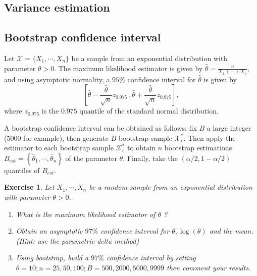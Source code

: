 \documentclass{article}\usepackage[]{graphicx}\usepackage[]{xcolor}
\newtheorem{exercise}{Exercise}
\begin{document}
\subsection{Variance estimation}

\subsection{Bootstrap confidence interval}

Let $\mathcal{X} = \lbrace X_1, \cdots, X_n\rbrace$ be a sample from an exponential distribution with parameter $\theta>0$. The maximum likelihood estimator is given by $\hat{\theta} = \frac{n}{X_1+\cdots + X_n},$ and using asymptotic normality, a $95\%$ confidence interval for $\hat{\theta}$ is given by 
\begin{equation}\label{Asymptotic normality Confidence interval}
\left[\hat{\theta}-\frac{\hat{\theta}}{\sqrt{n}}z_{0.975}~, \hat{\theta}+\frac{\hat{\theta}}{\sqrt{n}}z_{0.975}\right],
\end{equation}
where $z_{0.975}$ is the $0.975$ quantile of the standard normal distribution.

A bootstrap confidence interval can be obtained as follows: fix $B$ a large integer (5000 for example), then generate $B$ bootstrap sample $\mathcal{X}_i^*$. Then apply the estimator to each bootstrap sample $\mathcal{X}_i^*$ to obtain $n$ bootstrap estimations $B_{est}=\left\lbrace\hat{\theta}_1, \cdots, \hat{\theta}_n \right\rbrace$ of the parameter $\theta$. Finally, take the $(\alpha/2, 1-\alpha/2)$ quantiles of $B_{est}$.

\begin{exercise}
Let $X_1,\cdots, X_n$ be a random sample from an exponential distribution with parameter $\theta > 0$.
\begin{enumerate}
\item What is the maximum likelihood estimator of $\theta$ ? 
\item Obtain an asymptotic $97\%$ confidence interval for $\theta, \log(\theta)$ and the mean. (Hint: use the parametric delta method) 
\item Using bootstrap, build a $97\%$ confidence interval by setting $\theta = 10; n = 25, 50, 100; B = 500, 2000, 5000, 9999$ then comment your results. 
\end{enumerate}
\end{exercise}


\end{document}
